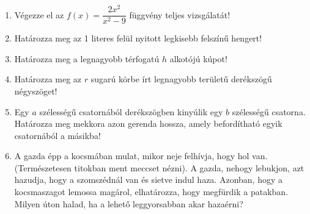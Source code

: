 \documentclass[a4paper, 12pt]{scrartcl}
\begin{document}
\begin{enumerate}
  \item Végezze el az $f(x) = \dfrac{2x^2}{x^2 - 9}$ függvény teljes
        vizsgálatát!

  \item Határozza meg az 1 literes felül nyitott legkisebb felszínű hengert!

  \item Határozza meg a legnagyobb térfogatú $h$ alkotójú kúpot!

  \item Határozza meg az $r$ sugarú körbe írt legnagyobb területű derékszögű
        négyszöget!

  \item Egy $a$ szélességű csatornából derékszögben kinyúlik egy $b$ szélességű
        csatorna. Határozza meg mekkora azon gerenda hossza, amely befordítható
        egyik csatornából a másikba!

  \item A gazda épp a kocsmában mulat, mikor neje felhívja, hogy hol van.
        (Természetesen titokban ment meccset nézni). A gazda, nehogy lebukjon,
        azt hazudja, hogy a szomszédnál van és sietve indul haza. Azonban, hogy
        a kocsmaszagot lemossa magárol, elhatározza, hogy megfürdik a patakban.
        Milyen úton halad, ha a lehető leggyorsabban akar hazaérni?
        \begin{center}
        \end{center}
\end{enumerate}

\end{document}
